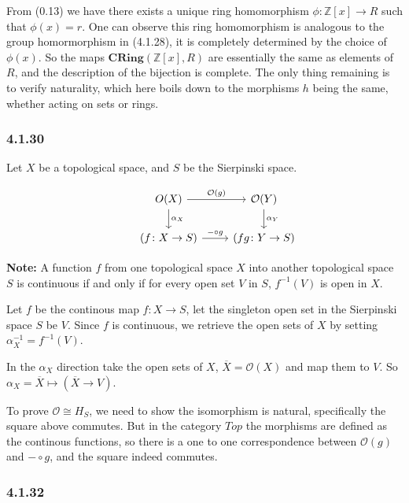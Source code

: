 \documentclass{article}
\begin{document}
From (0.13) we have there exists a unique ring homomorphism $\phi\colon \mathds{Z}[x] \rightarrow R$ such that $\phi(x) = r$. One can observe this ring homomorphism is analogous to the group homormorphism in (4.1.28), it is completely determined by the choice of $\phi(x)$. So the maps $\mathbf{CRing}(\mathds{Z}[x], R)$ are essentially the same as elements of $R$, and the description of the bijection is complete. The only thing remaining is to verify naturality, which here boils down to the morphisms $h$ being the same, whether acting on sets or rings.

\subsubsection*{4.1.30}

Let $X$ be a topological space, and $S$ be the Sierpinski space.

\begin{equation*}
\begin{tikzcd}
  & O(X) \arrow[d,"\alpha_X"] \arrow[r, "\mathcal{O}(g)"] & \mathcal{O}(Y) \arrow[d,"\alpha_Y"] \\
  & (f\colon X \rightarrow S) \arrow[r,"\mathit{-}\circ g"] & (fg\colon Y \rightarrow S)
\end{tikzcd}
\end{equation*}

\textbf{Note:} A function $f$ from one topological space $X$ into another topological space $S$ is continuous if and only if for every open set $V$ in $S$, $f^{-1}(V)$ is open in $X$.

Let $f$ be the continous map $f\colon X \rightarrow S$, let the singleton open set in the Sierpinski space $S$ be $V$. Since $f$ is continuous, we retrieve the open sets of $X$ by setting $\alpha_X^{-1} = f^{-1}(V)$.

In the $\alpha_X$ direction take the open sets of $X$, $\overline{X} = \mathcal{O}(X)$ and map them to $V$. So $\alpha_X = \overline{X} \mapsto (\overline{X} \rightarrow V)$.

To prove $\mathcal{O} \cong H_S$, we need to show the isomorphism is natural, specifically the square above commutes. But in the category $Top$ the morphisms are defined as the continous functions, so there is a one to one correspondence between $\mathcal{O}(g)$ and $\mathit{-} \circ g$, and the square indeed commutes.

\subsubsection*{4.1.32}
\end{document}
